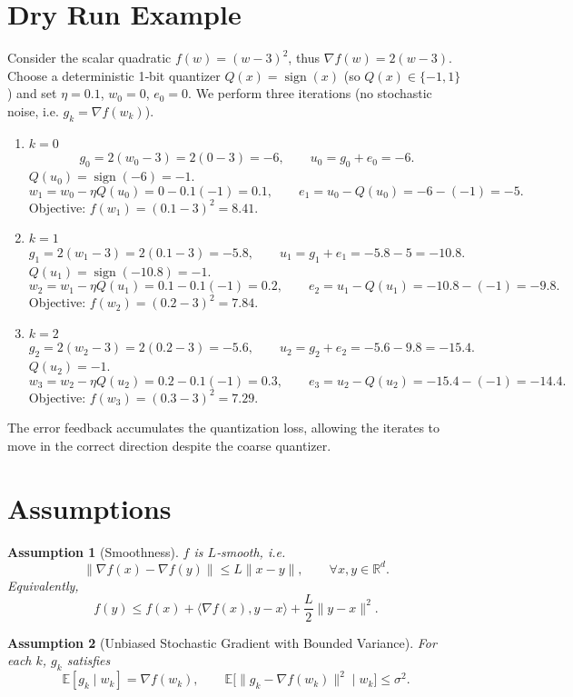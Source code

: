 \documentclass{article}
\newtheorem{assumption}{Assumption}
\newcommand{\EE}{\mathbb{E}}
\newcommand{\R}{\mathbb{R}}
\begin{document}
\section*{Dry Run Example}
Consider the scalar quadratic $f(w)=(w-3)^{2}$, thus $\nabla f(w)=2(w-3)$.  
Choose a deterministic 1‑bit quantizer $Q(x)=\operatorname{sign}(x)$ (so $Q(x)\in\{-1,1\}$) and set $\eta=0.1$, $w_{0}=0$, $e_{0}=0$.  
We perform three iterations (no stochastic noise, i.e. $g_k=\nabla f(w_k)$).

\begin{enumerate}[label=Iteration \arabic*:, leftmargin=*]
\item $k=0$  
\[
g_{0}=2(w_{0}-3)=2(0-3)=-6,\qquad 
u_{0}=g_{0}+e_{0}=-6.
\]  
$Q(u_{0})=\operatorname{sign}(-6)=-1$.  
\[
w_{1}=w_{0}-\eta Q(u_{0})=0-0.1(-1)=0.1,
\qquad 
e_{1}=u_{0}-Q(u_{0})=-6-(-1)=-5.
\]  
Objective: $f(w_{1})=(0.1-3)^{2}=8.41$.

\item $k=1$  
\[
g_{1}=2(w_{1}-3)=2(0.1-3)=-5.8,\qquad 
u_{1}=g_{1}+e_{1}=-5.8-5=-10.8.
\]  
$Q(u_{1})=\operatorname{sign}(-10.8)=-1$.  
\[
w_{2}=w_{1}-\eta Q(u_{1})=0.1-0.1(-1)=0.2,
\qquad 
e_{2}=u_{1}-Q(u_{1})=-10.8-(-1)=-9.8.
\]  
Objective: $f(w_{2})=(0.2-3)^{2}=7.84$.

\item $k=2$  
\[
g_{2}=2(w_{2}-3)=2(0.2-3)=-5.6,\qquad 
u_{2}=g_{2}+e_{2}=-5.6-9.8=-15.4.
\]  
$Q(u_{2})=-1$.  
\[
w_{3}=w_{2}-\eta Q(u_{2})=0.2-0.1(-1)=0.3,
\qquad 
e_{3}=u_{2}-Q(u_{2})=-15.4-(-1)=-14.4.
\]  
Objective: $f(w_{3})=(0.3-3)^{2}=7.29$.
\end{enumerate}
The error feedback accumulates the quantization loss, allowing the iterates to move in the correct direction despite the coarse quantizer.

\newpage

\section*{Assumptions}
\begin{assumption}[Smoothness]\label{as:smooth}
$f$ is $L$‑smooth, i.e.
\[
\|\nabla f(x)-\nabla f(y)\|\le L\|x-y\|,\qquad\forall x,y\in\R^{d}.
\]
Equivalently,
\[
f(y)\le f(x)+\langle\nabla f(x),y-x\rangle+\frac{L}{2}\|y-x\|^{2}.
\]
\end{assumption}

\begin{assumption}[Unbiased Stochastic Gradient with Bounded Variance]\label{as:sgd}
For each $k$, $g_k$ satisfies
\[
\EE[g_k\mid w_k]=\nabla f(w_k),\qquad
\EE\!\big[\|g_k-\nabla f(w_k)\|^{2}\mid w_k\big]\le\sigma^{2}.
\]
\end{assumption}
\end{document}
